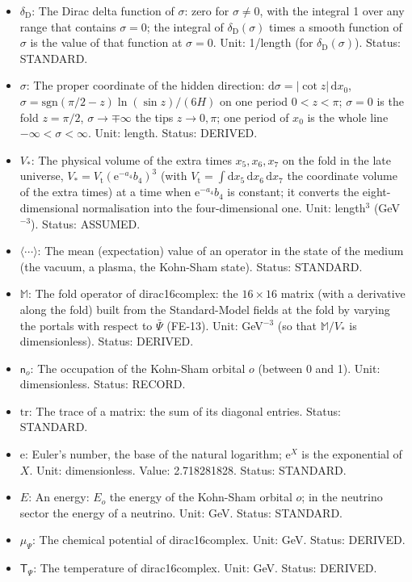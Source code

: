 \documentclass[
  10pt,
]{article}
\begin{document}
\begin{itemize}
  runs over the orbitals or the modes. Status: STANDARD.
\item
  \(\delta_{\mathrm{D}}\): The Dirac delta function of \(\sigma\): zero
  for \(\sigma \ne 0\), with the integral 1 over any range that contains
  \(\sigma = 0\); the integral of \(\delta_{\mathrm{D}}(\sigma)\) times
  a smooth function of \(\sigma\) is the value of that function at
  \(\sigma = 0\). Unit: 1/length (for \(\delta_{\mathrm{D}}(\sigma)\)).
  Status: STANDARD.
\item
  \(\sigma\): The proper coordinate of the hidden direction:
  \(\mathrm{d}\sigma = \lvert\cot z\rvert\,\mathrm{d}x_0\),
  \(\sigma = \mathrm{sgn}(\pi/2 - z)\ln(\sin z)/(6H)\) on one period
  \(0 < z < \pi\); \(\sigma = 0\) is the fold \(z = \pi/2\),
  \(\sigma \to \mp\infty\) the tips \(z \to 0, \pi\); one period of
  \(x_0\) is the whole line \(-\infty < \sigma < \infty\). Unit: length.
  Status: DERIVED.
\item
  \(V_*\): The physical volume of the extra times \(x_5, x_6, x_7\) on
  the fold in the late universe,
  \(V_* = V_{\mathrm{t}}(\mathrm{e}^{-a_4}b_4)^3\) (with
  \(V_{\mathrm{t}} = \int\mathrm{d}x_5\,\mathrm{d}x_6\,\mathrm{d}x_7\)
  the coordinate volume of the extra times) at a time when
  \(\mathrm{e}^{-a_4}b_4\) is constant; it converts the
  eight-dimensional normalisation into the four-dimensional one. Unit:
  length\(^3\) (GeV\(^{-3}\)). Status: ASSUMED.
\item
  \(\langle\cdots\rangle\): The mean (expectation) value of an operator
  in the state of the medium (the vacuum, a plasma, the Kohn-Sham
  state). Status: STANDARD.
\item
  \(\mathbb{M}\): The fold operator of dirac16complex: the
  \(16 \times 16\) matrix (with a derivative along the fold) built from
  the Standard-Model fields at the fold by varying the portals with
  respect to \(\bar\Psi\) (FE-13). Unit: GeV\(^{-3}\) (so that
  \(\mathbb{M}/V_*\) is dimensionless). Status: DERIVED.
\item
  \(\mathsf{n}_o\): The occupation of the Kohn-Sham orbital \(o\)
  (between 0 and 1). Unit: dimensionless. Status: RECORD.
\item
  \(\mathrm{tr}\): The trace of a matrix: the sum of its diagonal
  entries. Status: STANDARD.
\item
  \(\mathrm{e}\): Euler's number, the base of the natural logarithm;
  \(\mathrm{e}^{X}\) is the exponential of \(X\). Unit: dimensionless.
  Value: 2.718281828. Status: STANDARD.
\item
  \(E\): An energy: \(E_o\) the energy of the Kohn-Sham orbital \(o\);
  in the neutrino sector the energy of a neutrino. Unit: GeV. Status:
  STANDARD.
\item
  \(\mu_\Psi\): The chemical potential of dirac16complex. Unit: GeV.
  Status: DERIVED.
\item
  \(\mathsf{T}_\Psi\): The temperature of dirac16complex. Unit: GeV.
  Status: DERIVED.
\end{itemize}
\end{document}
